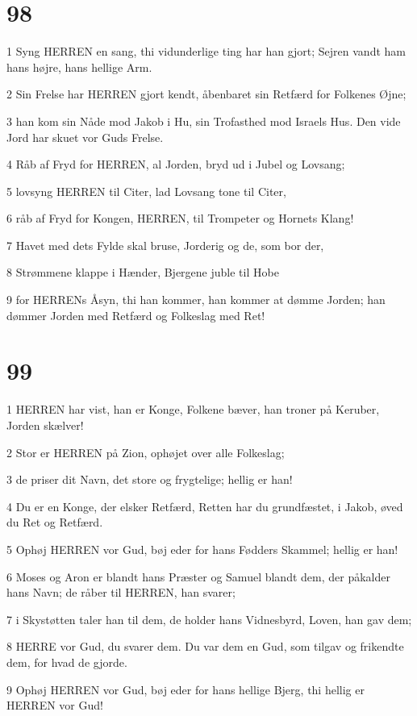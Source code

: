 \chapter{98}

\par 1 Syng HERREN en sang, thi vidunderlige ting har han gjort; Sejren vandt ham hans højre, hans hellige Arm.
\par 2 Sin Frelse har HERREN gjort kendt, åbenbaret sin Retfærd for Folkenes Øjne;
\par 3 han kom sin Nåde mod Jakob i Hu, sin Trofasthed mod Israels Hus. Den vide Jord har skuet vor Guds Frelse.
\par 4 Råb af Fryd for HERREN, al Jorden, bryd ud i Jubel og Lovsang;
\par 5 lovsyng HERREN til Citer, lad Lovsang tone til Citer,
\par 6 råb af Fryd for Kongen, HERREN, til Trompeter og Hornets Klang!
\par 7 Havet med dets Fylde skal bruse, Jorderig og de, som bor der,
\par 8 Strømmene klappe i Hænder, Bjergene juble til Hobe
\par 9 for HERRENs Åsyn, thi han kommer, han kommer at dømme Jorden; han dømmer Jorden med Retfærd og Folkeslag med Ret!

\chapter{99}

\par 1 HERREN har vist, han er Konge, Folkene bæver, han troner på Keruber, Jorden skælver!
\par 2 Stor er HERREN på Zion, ophøjet over alle Folkeslag;
\par 3 de priser dit Navn, det store og frygtelige; hellig er han!
\par 4 Du er en Konge, der elsker Retfærd, Retten har du grundfæstet, i Jakob, øved du Ret og Retfærd.
\par 5 Ophøj HERREN vor Gud, bøj eder for hans Fødders Skammel; hellig er han!
\par 6 Moses og Aron er blandt hans Præster og Samuel blandt dem, der påkalder hans Navn; de råber til HERREN, han svarer;
\par 7 i Skystøtten taler han til dem, de holder hans Vidnesbyrd, Loven, han gav dem;
\par 8 HERRE vor Gud, du svarer dem. Du var dem en Gud, som tilgav og frikendte dem, for hvad de gjorde.
\par 9 Ophøj HERREN vor Gud, bøj eder for hans hellige Bjerg, thi hellig er HERREN vor Gud!

